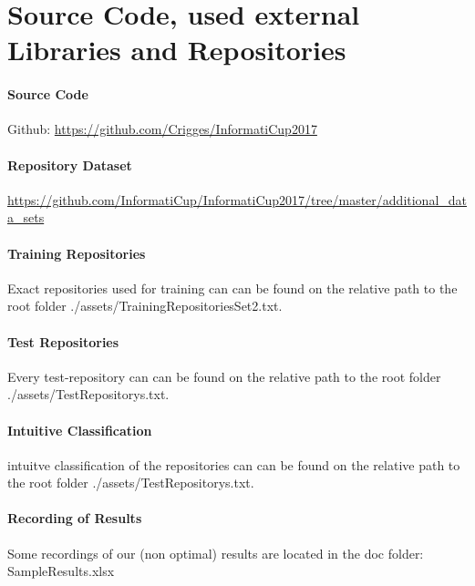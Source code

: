 \documentclass[paper=A4,pagesize=auto,12pt,headinclude=true,footinclude=true,BCOR=0mm,DIV=calc]{scrartcl}
\begin{document}
	
	\section{Source Code, used external Libraries and Repositories}
	\paragraph{Source Code}
	Github: \url{https://github.com/Crigges/InformatiCup2017}\\
	\paragraph{Repository Dataset}
	\label{src:Repositories}
	\url{https://github.com/InformatiCup/InformatiCup2017/tree/master/additional_data_sets}	\\
	
	\label{src:TrainingRepositories}
	\paragraph{Training Repositories}
	Exact repositories used for training can can be found on the relative path to the root folder ./assets/TrainingRepositoriesSet2.txt.
	
	\label{src:TestRepositories}
	\paragraph{Test Repositories}
	Every test-repository can can be found on the relative path to the root folder ./assets/TestRepositorys.txt.
	\paragraph{Intuitive Classification}
	\label{src:ClassifyTestRepositories}
	intuitve classification of the repositories can can be found on the relative path to the root folder ./assets/TestRepositorys.txt.
	
	\label{src:recordingsOfResults}
	\paragraph{Recording of Results}
	Some recordings of our (non optimal) results are located in the doc folder: SampleResults.xlsx
	
	
\end{document}

